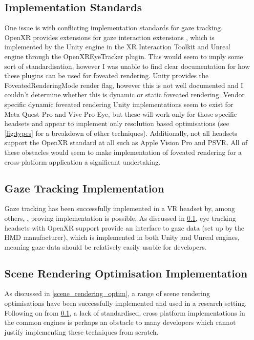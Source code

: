 \documentclass[a4paper,11pt]{article}
\begin{document}
\subsection{Implementation Standards}
\label{standards}
One issue is with conflicting implementation standards for gaze tracking. OpenXR provides extensions for gaze interaction extensions \cite{xr_gaze}, which is implemented by the Unity engine in the XR Interaction Toolkit \cite{xr_gaze_unity} and Unreal engine through the OpenXREyeTracker plugin\cite{xr_gaze_unreal}. This would seem to imply some sort of standardisation, however I was unable to find clear documentation for how these plugins can be used for foveated rendering. Unity provides the FoveatedRenderingMode render flag\cite{unity_fove}, however this is not well documented and I couldn't determine whether this is dynamic or static foveated rendering. Vendor specific dynamic foveated rendering Unity implementations seem to exist for Meta Quest Pro\cite{meta_unity} and Vive Pro Eye\cite{vive_unity}, but these will work only for those specific headsets and appear to implement only resolution based optimisations (see \cref{fig:types} for a breakdown of other techniques). Additionally, not all headsets support the OpenXR standard at all such as Apple Vision Pro and PSVR\cite{openxr_conform}. All of these obstacles would seem to make implementation of foveated rendering for a cross-platform application a significant undertaking.

\subsection{Gaze Tracking Implementation}
Gaze tracking has been successfully implemented in a VR headset by, among others, \textcite{li2017ultra,thies2016facevr}, proving implementation is possible. As discussed in \cref{standards}, eye tracking headsets with OpenXR support provide an interface to gaze data (set up by the HMD manufacturer), which is implemented in both Unity and Unreal engines, meaning gaze data should be relatively easily usable for developers.

\subsection{Scene Rendering Optimisation Implementation}
\label{render_optim_2}
As discussed in \cref{scene_rendering_optim}, a range of scene rendering optimisations have been successfully implemented and used in a research setting. Following on from \cref{standards}, a lack of standardised, cross platform implementations in the common engines is perhaps an obstacle to many developers which cannot justify implementing these techniques from scratch.
\end{document}
